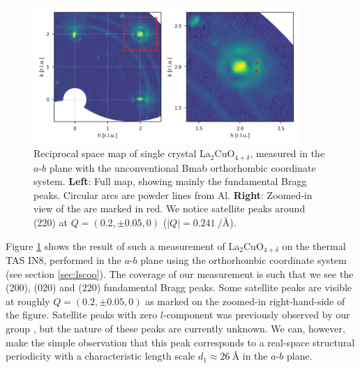 \begin{figure}
    \centering
    \includegraphics[width=0.9\textwidth]{fig/pdf/lcoo_ab_elastic.png}
    \caption{Reciprocal space map of single crystal La$_2$CuO$_{4+\delta}$, measured in the $a$-$b$ plane with the unconventional Bmab orthorhombic coordinate system. \textbf{Left}: Full map, showing mainly the fundamental Bragg peaks. Circular arcs are powder lines from Al. \textbf{Right}: Zoomed-in view of the are marked in red. We notice satellite peaks around (220) at $Q=(0.2,\pm 0.05,0)$ ($|Q| = \SI{0.241}{\per\angstrom}$).}
    \label{fig:lcoo_ab_elastic}
\end{figure}

Figure \ref{fig:lcoo_ab_elastic} shows the result of such a measurement of La$_2$CuO$_{4+\delta}$ on the thermal TAS IN8, performed in the $a$-$b$ plane using the orthorhombic coordinate system (see section \ref{sec:lscoo}). The coverage of our measurement is such that we see the (200), (020) and (220) fundamental Bragg peaks. Some satellite peaks are visible at roughly $Q = (0.2, \pm 0.05, 0)$ as marked on the zoomed-in right-hand-side of the figure. Satellite peaks with zero $l$-component was previously observed by our group \cite{Ray2016}, but the nature of these peaks are currently unknown. We can, however, make the simple observation that this peak corresponds to a real-space structural periodicity with a characteristic length scale $d_1 \approx \SI{26}{\angstrom}$ in the $a$-$b$ plane.

